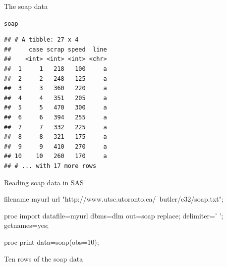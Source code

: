 \documentclass[unknownkeysallowed]{beamer}\usepackage[]{graphicx}\usepackage[]{color}
\makeatletter
\newcommand{\hlstd}[1]{\textcolor[rgb]{0.345,0.345,0.345}{#1}}%
\newenvironment{kframe}{%
 \def\at@end@of@kframe{}%
 \ifinner\ifhmode%
  \def\at@end@of@kframe{\end{minipage}}%
  \begin{minipage}{\columnwidth}%
 \fi\fi%
 \def\FrameCommand##1{\hskip\@totalleftmargin \hskip-\fboxsep
 \colorbox{shadecolor}{##1}\hskip-\fboxsep
     \hskip-\linewidth \hskip-\@totalleftmargin \hskip\columnwidth}%
 \MakeFramed {\advance\hsize-\width
   \@totalleftmargin\z@ \linewidth\hsize
   \@setminipage}}%
 {\par\unskip\endMakeFramed%
 \at@end@of@kframe}
\newenvironment{knitrout}{}{} %
\makeatother
\begin{document}
\begin{frame}[fragile]{The soap data}
  
\begin{knitrout}
\color{fgcolor}\begin{kframe}
\begin{alltt}
\hlstd{soap}
\end{alltt}
\begin{verbatim}
## # A tibble: 27 x 4
##     case scrap speed  line
##    <int> <int> <int> <chr>
##  1     1   218   100     a
##  2     2   248   125     a
##  3     3   360   220     a
##  4     4   351   205     a
##  5     5   470   300     a
##  6     6   394   255     a
##  7     7   332   225     a
##  8     8   321   175     a
##  9     9   410   270     a
## 10    10   260   170     a
## # ... with 17 more rows
\end{verbatim}
\end{kframe}
\end{knitrout}
  
\end{frame}

\begin{frame}[fragile]{Reading soap data in SAS}
  
  \begin{Sascode}[store=ub]
filename myurl 
 url 
 "http://www.utsc.utoronto.ca/~butler/c32/soap.txt";

proc import 
  datafile=myurl 
  dbms=dlm
  out=soap
  replace;
  delimiter=' ';
  getnames=yes;
  
proc print data=soap(obs=10);

  \end{Sascode}
  
\end{frame}

\begin{frame}[fragile]{Ten rows of the soap data}
  
  
\end{frame}
\end{document}
